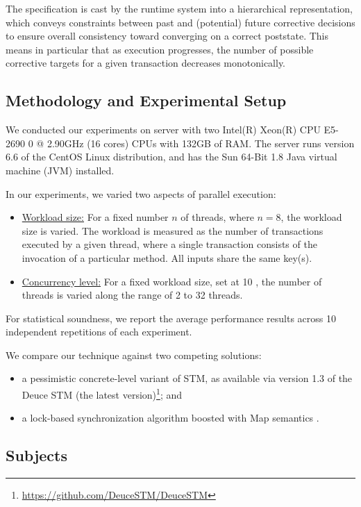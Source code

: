 The specification is cast by the runtime system into a hierarchical representation, which conveys constraints between past and (potential) future corrective decisions to ensure overall consistency toward converging on a correct poststate. This means in particular that as execution progresses, the number of possible corrective targets for a given transaction decreases monotonically.

\subsection{Methodology and Experimental Setup}

We conducted our experiments on server with two Intel(R) Xeon(R) CPU E5-2690 0 @ 2.90GHz (16 cores) CPUs with 132GB of RAM. The server runs version
6.6 of the CentOS Linux distribution, and has the Sun 64-Bit 1.8 Java virtual machine (JVM) installed.

In our experiments, we varied two aspects of parallel execution:
\begin{itemize}
	\item \underline{Workload size:} For a fixed number $n$ of threads, where $n=8$,  the workload size is varied. The workload is measured as the number of transactions executed by a given thread, where a single transaction consists of the invocation of a particular method. All inputs share the same key(s).
	\item \underline{Concurrency level:} For a fixed workload size, set at 10%
	, the number of threads is varied along the range of 2 to 32 threads.  
\end{itemize}
For statistical soundness, we report the average performance results across 10 independent repetitions of each experiment.

We compare our technique against two competing solutions:
\begin{itemize}
	\item a pessimistic concrete-level variant of STM, as available via version 1.3 of the Deuce STM (the latest version)\footnote{
		\url{https://github.com/DeuceSTM/DeuceSTM}
	}; and
	\item a lock-based synchronization algorithm boosted with {\sf Map} semantics \cite{ppopp/HerlihyK08}.
\end{itemize}

\subsection{Subjects}

